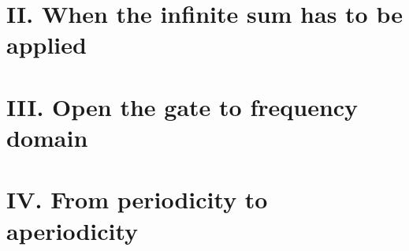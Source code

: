\documentclass[margin,line]{res}
\begin{document}
\begin{resume}
\begin{figure}[H]
	\centerline{}
\end{figure}
\clearpage

\section{\sc II. When the infinite sum has to be applied}
\clearpage

\section{\sc III. Open the gate to frequency domain}
\clearpage

\section{\sc IV. From periodicity to aperiodicity}
\clearpage

\end{resume}
\end{document}
